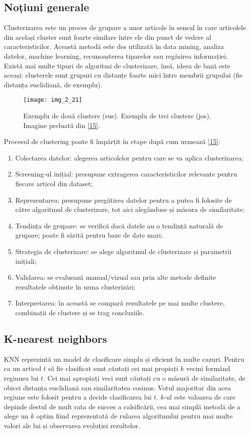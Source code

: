 \subsection{Noțiuni generale}

Clusterizarea este un proces de grupare a unor articole în sensul în care articolele din același cluster sunt foarte similare între ele din punct de vedere al caracteristicilor. Această metodă este des utilizată în data mining, analiza datelor, machine learning, recunoașterea tiparelor sau regăsirea informației. Există mai multe tipuri de algoritmi de clusterizare, însă, ideea de bază este aceași: clusterele sunt grupuri cu distanțe foarte mici între membrii grupului (fie distanța euclidiană, de exemplu).
\begin{figure}[!h]
	\centering
	\texttt{[image: img\_2\_21]}
	\caption[Exemplu clustere]{Exemplu de două clustere (sus). Exemplu de trei clustere (jos). Imagine preluată din \hyperlink{dataclusteringtechniques}{[15]}.}
\end{figure}  

Procesul de clustering poate fi împărțit în etape după cum urmează \hyperlink{dataclusteringtechniques}{[15]}:
\begin{enumerate}
	\item Colectarea datelor: alegerea articolelor pentru care se va aplica clusterizarea;
	\item Screening-ul inițial: presupune extragerea caracteristicilor relevante pentru fiecare articol din dataset;
	\item Reprezentarea: presupune pregătirea datelor pentru a putea fi folosite de către algoritmul de clusterizare, tot aici alegânduse și măsura de similaritate;
	\item Tendința de grupare: se verifică dacă datele au o tendință naturală de grupare; poate fi sărită pentru baze de date mari;
	\item Strategia de clusterizare: se alege algoritmul de clusterizare și parametrii inițiali;
	\item Validarea: se evaluează manual/vizual sau prin alte metode definite rezultatele obținute în urma clusterizări;
	\item Interpretarea: în această se compară rezultatele pe mai multe clustere, combinații de clustere și se trag concluziile.
\end{enumerate}

\subsection{K-nearest neighbors}
KNN reprezintă un model de clasificare simplu și eficient în multe cazuri. Pentru ca un articol $t$ să fie clasificat sunt căutați cei mai propiați $k$ vecini formând regiunea lui $t$. Cei mai apropiați veci sunt căutați cu o măsură de similaritate, de obicei distanța euclidiană sau similaritatea cosinus. Votul majoritar din acea regiune este folosit pentru a decide clasificarea lui $t$. $k$-ul este valoarea de care depinde destul de mult rata de succes a calsificării, cea mai simplă metodă de a alege un $k$ optim fiind reprezentată de rularea algoritmului pentru mai multe valori ale lui și observarea evoluției rezultelor.

